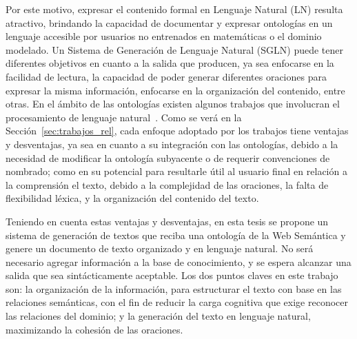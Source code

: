 \documentclass[11pt,a4paper,spanish]{book}
\begin{document}
Por este motivo, expresar el contenido formal en Lenguaje Natural (LN) resulta atractivo, brindando la capacidad de documentar y expresar ontologías en un lenguaje accesible por usuarios no entrenados en matemáticas o el dominio modelado. Un Sistema de Generación de Lenguaje Natural (SGLN) puede tener diferentes objetivos en cuanto a la salida que producen, ya sea enfocarse en la facilidad de lectura, la capacidad de poder generar diferentes oraciones para expresar la misma información,  enfocarse en la organización del contenido, entre otras. En el ámbito de las ontologías existen algunos trabajos que involucran el procesamiento de lenguaje natural~\cite{moreno2018ontologia}\cite{perez2002explotacion}\cite{vallez2009web}. Como se verá en la Sección~\ref{sec:trabajos_rel}, cada enfoque adoptado por los trabajos tiene ventajas y desventajas, ya sea en cuanto a su integración con las ontologías, debido a la necesidad de modificar la ontología subyacente o de requerir convenciones de nombrado; como en su potencial para resultarle útil al usuario final en relación a la comprensión el texto, debido a la complejidad de las oraciones, la falta de flexibilidad léxica, y la organización del contenido del texto.  

Teniendo en cuenta estas ventajas y desventajas, en esta tesis se propone un sistema de generación de textos que reciba una ontología de la Web Semántica y genere un documento de texto organizado y en lenguaje natural. No será necesario agregar información a la base de conocimiento, y se espera alcanzar una salida que sea sintácticamente aceptable. Los dos puntos claves en este trabajo son: la organización de la información, para estructurar el texto con base en las relaciones semánticas, con el fin de reducir la carga cognitiva que exige reconocer las relaciones del dominio; y la generación del texto en lenguaje natural, maximizando la cohesión de las oraciones.

\end{document}
